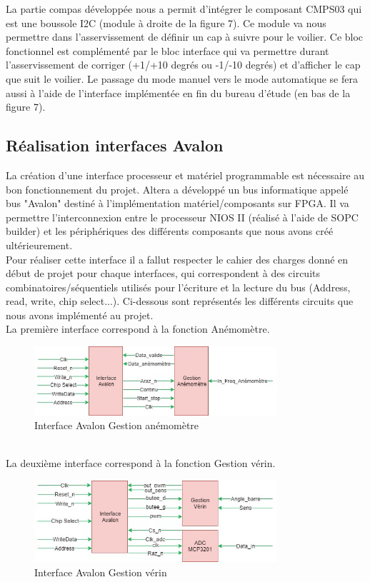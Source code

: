   La partie compas développée nous a permit d'intégrer le composant CMPS03 qui est une boussole I2C (module à droite de la figure 7). Ce module va nous permettre dans l'asservissement de définir un cap à suivre pour le voilier. Ce bloc fonctionnel est complémenté par le bloc interface qui va permettre durant l'asservissement de corriger (+1/+10 degrés ou -1/-10 degrés) et d'afficher le cap que suit le voilier. Le passage du mode manuel vers le mode automatique se fera aussi à l'aide de l'interface implémentée en fin du bureau d'étude (en bas de la figure 7). 

  \newpage

  \subsection{Réalisation interfaces Avalon}

La création d'une interface processeur et matériel programmable est nécessaire au bon fonctionnement du projet. Altera a développé un bus informatique appelé bus "Avalon" destiné à l'implémentation matériel/composants sur FPGA. Il va permettre l'interconnexion entre le processeur NIOS II (réalisé à l'aide de SOPC builder) et les périphériques des différents composants que nous avons créé ultérieurement.\\
\newline
Pour réaliser cette interface il a fallut respecter le cahier des charges donné en début de projet pour chaque interfaces, qui correspondent à des circuits combinatoires/séquentiels utilisés pour l'écriture et la lecture du bus (Address, read, write, chip select...). Ci-dessous sont représentés les différents circuits que nous avons implémenté au projet.\\
\newline
La première interface correspond à la fonction Anémomètre.
\begin{figure}[h]
  \begin{center}
    \includegraphics[width=0.8\textwidth]{images/avalon_anemo.jpg}
    \caption{Interface Avalon Gestion anémomètre}
  \end{center}
\end{figure}\\
\newline
La deuxième interface correspond à la fonction Gestion vérin.

\begin{figure}[h]
  \begin{center}
    \includegraphics[width=0.8\textwidth]{images/avalon_verin.jpg}
    \caption{Interface Avalon Gestion vérin}
  \end{center}
\end{figure}